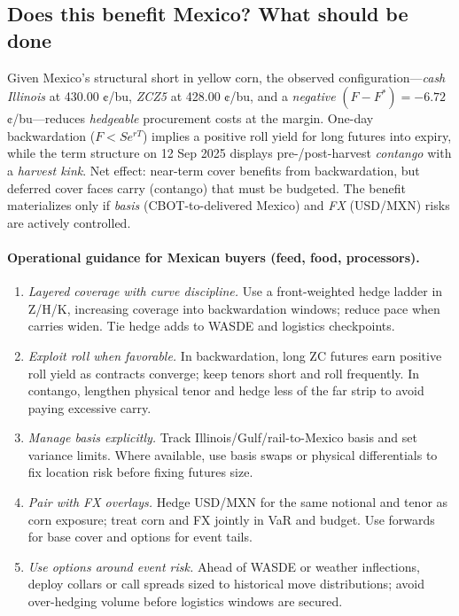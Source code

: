 \documentclass[11pt,a4paper]{article} %
\begin{document}
\subsection{Does this benefit Mexico? What should be done}


Given Mexico's structural short in yellow corn, the observed configuration—\emph{cash Illinois} at 430.00 ¢/bu, \emph{ZCZ5} at 428.00 ¢/bu, and a \emph{negative} \((F-F^{*})=-6.72\) ¢/bu—reduces \emph{hedgeable} procurement costs at the margin. One-day backwardation (\(F<S e^{rT}\)) implies a positive roll yield for long futures into expiry, while the term structure on 12 Sep 2025 displays pre-/post-harvest \emph{contango} with a \emph{harvest kink}. Net effect: near-term cover benefits from backwardation, but deferred cover faces carry (contango) that must be budgeted. The benefit materializes only if \emph{basis} (CBOT-to-delivered Mexico) and \emph{FX} (USD/MXN) risks are actively controlled.

\paragraph{Operational guidance for Mexican buyers (feed, food, processors).}
\begin{enumerate}
  \item \textit{Layered coverage with curve discipline.} Use a front-weighted hedge ladder in Z/H/K, increasing coverage into backwardation windows; reduce pace when carries widen. Tie hedge adds to WASDE and logistics checkpoints.
  \item \textit{Exploit roll when favorable.} In backwardation, long ZC futures earn positive roll yield as contracts converge; keep tenors short and roll frequently. In contango, lengthen physical tenor and hedge less of the far strip to avoid paying excessive carry.
  \item \textit{Manage basis explicitly.} Track Illinois/Gulf/rail-to-Mexico basis and set variance limits. Where available, use basis swaps or physical differentials to fix location risk before fixing futures size.
  \item \textit{Pair with FX overlays.} Hedge USD/MXN for the same notional and tenor as corn exposure; treat corn and FX jointly in VaR and budget. Use forwards for base cover and options for event tails.
  \item \textit{Use options around event risk.} Ahead of WASDE or weather inflections, deploy collars or call spreads sized to historical move distributions; avoid over-hedging volume before logistics windows are secured.
\end{enumerate}
\end{document}
